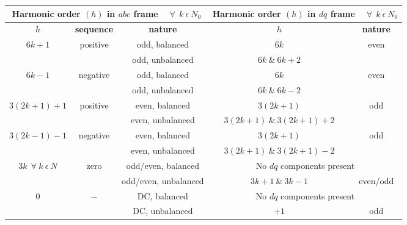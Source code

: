 \begin{table}[ht] 
	\centering
	\label{table3.1}
	\begin{tabular}{|c|c|c|c|c|} 
		\hline
		\multicolumn{3}{|c|}{\footnotesize \textbf{Harmonic order \boldmath$(h)$ in \boldmath$abc$ frame ~ $\forall ~~ k ~ \epsilon ~ N_{0}$ }} &  \multicolumn{2}{|c|}{\footnotesize \textbf{Harmonic order \boldmath$(h)$ in \boldmath$dq$ frame ~ $\forall ~~ k ~ \epsilon ~ N_{0}$ }} \\
		\hline
		\footnotesize \boldmath$h$ & \footnotesize \textbf{sequence} & \footnotesize \textbf{nature} & \footnotesize \boldmath$h$ & \footnotesize \textbf{nature} \\
		\hline
		\multirow{2}{*}{\footnotesize $6k + 1$} & \multirow{2}{*}{\footnotesize positive} & \footnotesize odd, balanced & \footnotesize $6k$ & \multirow{2}{*}{\footnotesize even} \\ 
		\cline{3-4}
		&  & \footnotesize odd, unbalanced & \footnotesize $6k ~ \& ~ 6k+2$ &  \\
		\hline
		\multirow{2}{*}{\footnotesize $6k - 1$} & \multirow{2}{*}{\footnotesize negative} & \footnotesize odd, balanced & \footnotesize $6k$ & \multirow{2}{*}{\footnotesize even} \\ 
		\cline{3-4}
		&  & \footnotesize odd, unbalanced & \footnotesize $6k ~ \& ~ 6k-2$ &  \\
		\hline
		\multirow{2}{*}{\footnotesize $3(2k + 1)+1$} & \multirow{2}{*}{\footnotesize positive} & \footnotesize even, balanced & \footnotesize $3(2k+1)$ & \multirow{2}{*}{\footnotesize odd} \\ 
		\cline{3-4}
		&  & \footnotesize even, unbalanced & \footnotesize $3(2k+1) ~ \& ~ 3(2k+1)+2$  &  \\
		\hline
		\multirow{2}{*}{\footnotesize $3(2k - 1)-1$} & \multirow{2}{*}{\footnotesize negative} & \footnotesize even, balanced & \footnotesize $3(2k+1)$ & \multirow{2}{*}{\footnotesize odd} \\ 
		\cline{3-4}
		&  & \footnotesize even, unbalanced & \footnotesize $3(2k+1) ~ \& ~ 3(2k+1)-2$  &  \\
		\hline
		\multirow{2}{*}{\footnotesize $3k ~~\forall ~ k ~ \epsilon ~ N$} & \multirow{2}{*}{\footnotesize zero} & \footnotesize odd/even, balanced & \multicolumn{2}{|c|}{\footnotesize No $dq$ components present} \\ 
		\cline{3-5}
		&  & \footnotesize odd/even, unbalanced & \footnotesize $3k+1 ~ \& ~ 3k-1$ & \footnotesize even/odd  \\
		\hline
		\multirow{2}{*}{\footnotesize $0$} & \multirow{2}{*}{$-$} & \footnotesize DC, balanced & \multicolumn{2}{|c|}{\footnotesize No $dq$ components present} \\ 
		\cline{3-5}
		&  & \footnotesize DC, unbalanced & \footnotesize $+1 $ & \footnotesize odd  \\
		\hline
	\end{tabular} 
\end{table}\vspace*{-0.5cm}

